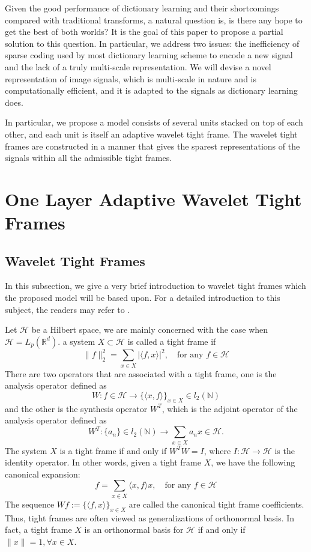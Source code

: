 \documentclass[a4paper]{article}
\begin{document}
Given the good performance of dictionary learning and their shortcomings compared with traditional transforms, a natural question is, is there any hope to get the best of both worlds? It is the goal of this paper to propose a partial solution to this question. In particular, we address two issues: the inefficiency of sparse coding used by most dictionary learning scheme to encode a new signal and the lack of a truly multi-scale representation. We will devise a novel representation of image signals, which is multi-scale in nature and is computationally efficient, and it is adapted to the signals as dictionary learning does. 

In particular, we propose a model consists of several units stacked on top of each other, and each unit is itself an adaptive wavelet tight frame. The wavelet tight frames are constructed in a manner that gives the sparest representations of the signals within all the admissible tight frames.

\section{One Layer Adaptive Wavelet Tight Frames}

\subsection{Wavelet Tight Frames}
In this subsection, we give a very brief introduction to wavelet tight frames which the proposed model will be based upon. For a detailed introduction to this subject, the readers may refer to \cite{shen2010wavelet,daubechies2003framelets}.

Let $\mathcal{H}$ be a Hilbert space, we are mainly concerned with the case when $\mathcal{H}=L_p(\mathbb{R}^d)$. a system $X\subset \mathcal{H}$ is called a tight frame if
\[
\|f\|_2^2 = \sum_{x\in X} |\langle f,x\rangle |^2, \quad \textrm{for any } f\in \mathcal{H}
\]
There are two operators that are associated with a tight frame, one is the analysis operator defined as
\[
W: f\in \mathcal{H} \rightarrow \{\langle x,f\rangle\}_{x\in X} \in l_2(\mathbb{N})
\]
and the other is the synthesis operator $W^T$, which is the adjoint operator of the analysis operator defined as
\[
W^T : \{a_n\} \in l_2(\mathbb{N}) \rightarrow \sum_{x\in X} a_n x\in \mathcal{H}.
\]
The system $X$ is a tight frame if and only if $W^TW=I$, where $I: \mathcal{H} \rightarrow \mathcal{H}$ is the identity operator. In other words, given a tight frame $X$, we have the following canonical expansion:
\[
f=\sum_{x\in X} \langle x,f\rangle x, \quad \textrm{for any } f\in \mathcal{H}
\]
The sequence $Wf:=\{\langle f,x\rangle \}_{x\in X}$ are called the canonical tight frame coefficients. Thus, tight frames are often viewed as generalizations of orthonormal basis. In fact, a tight frame $X$ is an orthonormal basis for $\mathcal{H}$ if and only if $\|x\|=1,\forall x\in X$.
\end{document}
